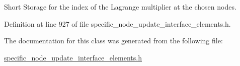 Short Storage for the index of the Lagrange multiplier at the chosen nodes. 



Definition at line 927 of file specific\+\_\+node\+\_\+update\+\_\+interface\+\_\+elements.\+h.



The documentation for this class was generated from the following file\+:\begin{DoxyCompactItemize}
\item 
\hyperlink{specific__node__update__interface__elements_8h}{specific\+\_\+node\+\_\+update\+\_\+interface\+\_\+elements.\+h}\end{DoxyCompactItemize}
